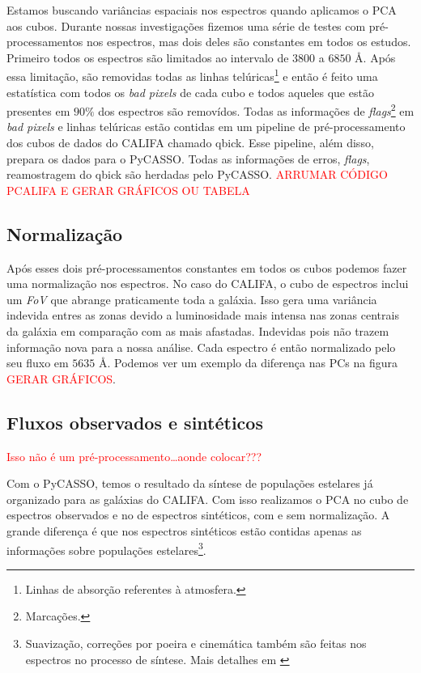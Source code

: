 Estamos buscando variâncias espaciais nos espectros quando aplicamos o PCA aos
cubos. Durante nossas investigações fizemos uma série de testes com
pré-processamentos nos espectros, mas dois deles são constantes em todos os
estudos. Primeiro todos os espectros são limitados ao intervalo de $3800$ a
$6850$ \AA. Após essa limitação, são removidas todas as linhas
telúricas\footnote{Linhas de absorção referentes à atmosfera.} e então é feito
uma estatística com todos os {\em bad pixels} de cada cubo e todos aqueles que
estão presentes em $90\%$ dos espectros são removídos. Todas as informações de
{\em flags}\footnote{Marcações.} em {\em bad pixels} e linhas telúricas estão
contidas em um pipeline de pré-processamento dos cubos de dados do CALIFA
chamado {\sc qbick}. Esse pipeline, além disso, prepara os dados para o PyCASSO.
Todas as informações de erros, {\em flags}, reamostragem do {\sc qbick} são
herdadas pelo PyCASSO. \fixme \textcolor{red}{ARRUMAR CÓDIGO PCALIFA E GERAR
GRÁFICOS OU TABELA}

\subsection{Normalização}
\label{sec:UsoPCA:PCAlidades:norm}

Após esses dois pré-processamentos constantes em todos os cubos podemos fazer
uma normalização nos espectros. No caso do CALIFA, o cubo de espectros inclui um
{\em FoV} que abrange praticamente toda a galáxia. Isso gera uma variância
indevida entres as zonas devido a luminosidade mais intensa nas zonas centrais
da galáxia em comparação com as mais afastadas. Indevidas pois não trazem
informação nova para a nossa análise. Cada espectro é então normalizado pelo seu
fluxo em $5635$ \AA. Podemos ver um exemplo da diferença nas PCs na figura
\fixme \textcolor{red}{GERAR GRÁFICOS}.

\subsection{Fluxos observados e sintéticos}
\label{sec:UsoPCA:PCAlidades:flux}

\fixme \textcolor{red}{Isso não é um pré-processamento\ldots aonde colocar???}

Com o PyCASSO, temos o resultado da síntese de populações estelares já
organizado para as galáxias do CALIFA. Com isso realizamos o PCA no cubo de
espectros observados e no de espectros sintéticos, com e sem normalização. A
grande diferença é que nos espectros sintéticos estão contidas apenas as
informações sobre populações estelares\footnote{Suavização, correções por
poeira e cinemática também são feitas nos espectros no processo de síntese. Mais
detalhes em \citet{CidFernandes2005}}.


